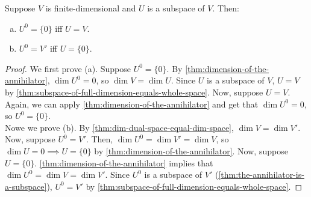 \documentclass{article}
\begin{document}
\begin{theorem}
  Suppose $V$ is finite-dimensional and $U$ is a subspace of
  $V$. Then:
  \begin{enumerate}[(a)]
  \item $U^0 = \{0\}$ iff $U = V$.
  \item $U^0 = V'$ iff $U = \{0\}$.
  \end{enumerate}  
\end{theorem}
\begin{proof}
  We first prove (a). Suppose $U^0 = \{0\}$. By
  \cref{thm:dimension-of-the-annihilator}, $\dim U^0 = 0$, so $\dim V
  = \dim U$. Since $U$ is a subspace of $V$, $U = V$ by
  \cref{thm:subspace-of-full-dimension-equals-whole-space}. Now,
  suppose $U = V$. Again, we can apply
  \cref{thm:dimension-of-the-annihilator} and get that $\dim U^0 = 0$,
  so $U^0 = \{0\}$. \\
  Nowe we prove (b). By \cref{thm:dim-dual-space-equal-dim-space},
  $\dim V = \dim V'$. Now, suppose $U^0 = V'$. Then, $\dim U^0 = \dim
  V' = \dim V$, so $\dim U = 0 \implies U = \{0\}$ by
  \cref{thm:dimension-of-the-annihilator}. Now, suppose $U =
  \{0\}$. \cref{thm:dimension-of-the-annihilator} implies that $\dim
  U^0 = \dim V = \dim V'$. Since $U^0$ is a subspace of $V'$
  (\cref{thm:the-annihilator-is-a-subspace}), $U^0 = V'$ by \cref{thm:subspace-of-full-dimension-equals-whole-space}.
\end{proof}
\end{document}
